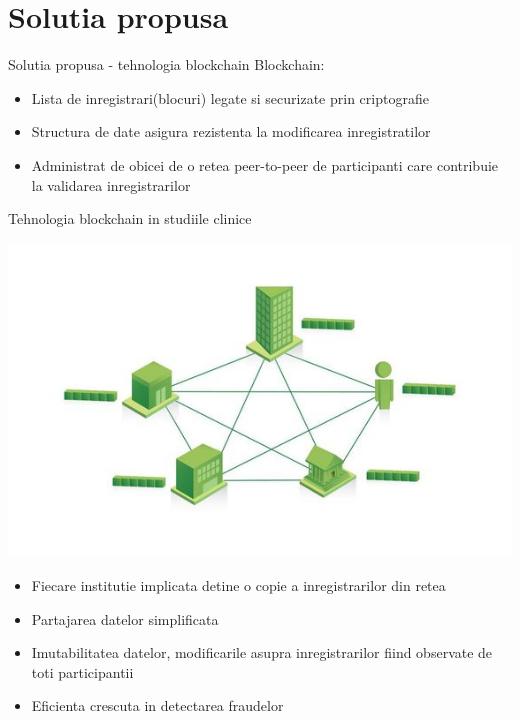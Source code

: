 \documentclass[10pt]{beamer}
\begin{document}
  \section{Solutia propusa}
  \begin{frame}{Solutia propusa - tehnologia blockchain}
  	Blockchain:
  	\begin{itemize}%
  		\item Lista de inregistrari(blocuri) legate si securizate prin criptografie
  		\item Structura de date asigura rezistenta la modificarea inregistratilor
  		\item Administrat de obicei de o retea peer-to-peer de participanti care contribuie la validarea inregistrarilor
  	\end{itemize}
  \end{frame}
  \begin{frame}{Tehnologia blockchain in studiile clinice}
  	\begin{center}
  		\includegraphics[scale=0.25]{proposed.jpg}
	\end{center}
	\begin{itemize}%
	
  			\item {\small Fiecare institutie implicata detine o copie a inregistrarilor din retea}
  			\item {\small Partajarea datelor simplificata}
  			\item {\small Imutabilitatea datelor, modificarile asupra inregistrarilor fiind observate de toti participantii}	
  			\item {\small Eficienta crescuta in detectarea fraudelor}
  	\end{itemize}
  \end{frame}
\end{document}
